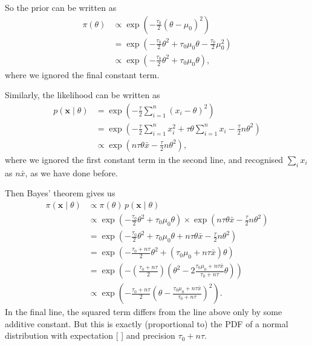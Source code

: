 \documentclass[
  letterpaper,
]{report}
\theoremstyle{definition}
\theoremstyle{definition}
\theoremstyle{remark}
\begin{document}
So the prior can be written as \begin{align*}
\pi(\theta) &\propto \exp\left(-\frac{\tau_0}{2} (\theta - \mu_0)^2 \right) \\
  &= \exp\left(-\frac{\tau_0}{2}\theta^2 + \tau_0\mu_0\theta -  \frac{\tau_0}{2}\mu_0^2 \right) \\
  &\propto \exp\left(-\frac{\tau_0}{2}\theta^2 + \tau_0\mu_0\theta \right) ,
\end{align*} where we ignored the final constant term.

Similarly, the likelihood can be written as \begin{align*}
p(\mathbf x \mid \theta) &= \exp \left( - \frac{\tau}{2} \sum_{i=1}^n (x_i - \theta)^2 \right) \\
  &= \exp \left( - \frac{\tau}{2} \sum_{i=1}^n x_i^2 + \tau \theta \sum_{i=1}^n x_i - \frac{\tau}{2} n\theta^2 \right) \\
  &\propto \exp \left(n \tau \theta \bar x - \frac{\tau}{2} n\theta^2 \right) ,
\end{align*} where we ignored the first constant term in the second
line, and recognised \(\sum_i x_i\) as \(n\bar x\), as we have done
before.

Then Bayes' theorem gives us \begin{align*}
\pi(\mathbf x \mid \theta)
  &\propto \pi(\theta) \, p(\mathbf x \mid \theta) \\
  &\propto \exp\left(-\frac{\tau_0}{2}\theta^2 + \tau_0\mu_0\theta \right) \times \exp \left(n \tau \theta \bar x - \frac{\tau}{2} n\theta^2 \right) \\
  &= \exp\left(-\frac{\tau_0}{2}\theta^2 + \tau_0\mu_0\theta + n \tau \theta \bar x - \frac{\tau}{2} n\theta^2 \right) \\
  &= \exp \left( -\frac{\tau_0 + n\tau}{2} \theta^2 + (\tau_0\mu_0 + n\tau\bar x)\theta \right) \\
  &= \exp \left( -\left(\frac{\tau_0 + n\tau}{2}\right) \left(\theta^2 - 2 \frac{\tau_0\mu_0 + n\tau\bar x}{\tau_0 + n\tau}\theta \right) \right) \\
  &\propto \exp \left( - \tfrac{\tau_0 + n\tau}{2} \left( \theta - \frac{\tau_0 \mu_0 +n\tau \bar x }{\tau_0 + n\tau} \right)^{\!2} \right) .
\end{align*} In the final line, the squared term differs from the line
above only by some additive constant. But this is exactly (proportional
to) the PDF of a normal distribution with expectation {[}
 {]} and precision
\(\tau_0 + n\tau\).
\end{document}
